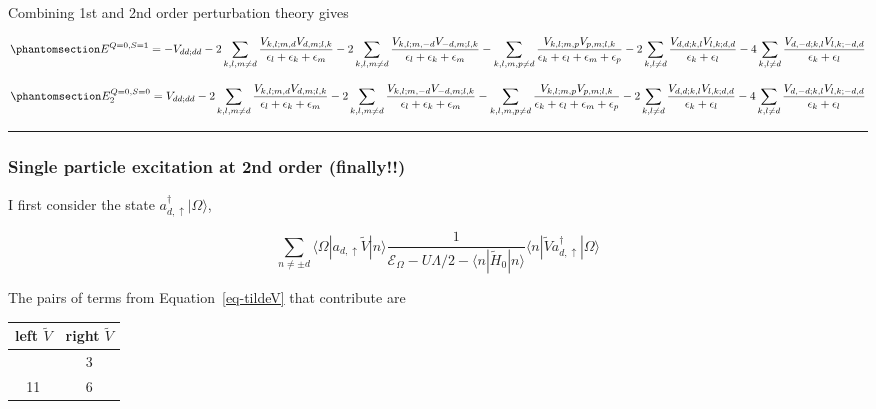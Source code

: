 \documentclass[
  letterpaper,
  DIV=11,
  numbers=noendperiod]{scrartcl}
\newcounter{none} %
\begin{document}
Combining 1st and 2nd order perturbation theory gives

\begin{equation}\protect\phantomsection\label{eq-EQ0S1}{
E^{Q=0,S=1}=-V_{dd;dd}-2\sum_{k,l,m\ne d}\frac{V_{k,l;m,d}V_{d,m;l,k}}{\epsilon_{l}+\epsilon_{k}+\epsilon_m}
-2\sum_{k,l,m\ne d}\frac{V_{k,l;m,-d}V_{-d,m;l,k}}{\epsilon_{l}+\epsilon_{k}+\epsilon_m}
-\sum_{k,l,m,p\ne d}\frac{V_{k,l;m,p}V_{p,m;l,k}}{\epsilon_{k}+\epsilon_{l}+\epsilon_m+\epsilon_p}
-2\sum_{k,l\ne d}\frac{V_{d,d;k,l}V_{l,k;d,d}}{\epsilon_{k}+\epsilon_{l}}
-4\sum_{k,l\ne d}\frac{V_{d,-d;k,l}V_{l,k;-d,d}}{\epsilon_{k}+\epsilon_{l}}
}\end{equation}

\begin{equation}\protect\phantomsection\label{eq-EQ0S02}{
E^{Q=0,S=0}_2=V_{dd;dd}-2\sum_{k,l,m\ne d}\frac{V_{k,l;m,d}V_{d,m;l,k}}{\epsilon_{l}+\epsilon_{k}+\epsilon_m}
-2\sum_{k,l,m\ne d}\frac{V_{k,l;m,-d}V_{-d,m;l,k}}{\epsilon_{l}+\epsilon_{k}+\epsilon_m}
-\sum_{k,l,m,p\ne d}\frac{V_{k,l;m,p}V_{p,m;l,k}}{\epsilon_{k}+\epsilon_{l}+\epsilon_m+\epsilon_p}
-2\sum_{k,l\ne d}\frac{V_{d,d;k,l}V_{l,k;d,d}}{\epsilon_{k}+\epsilon_{l}}
-4\sum_{k,l\ne d}\frac{V_{d,-d;k,l}V_{l,k;-d,d}}{\epsilon_{k}+\epsilon_{l}}
}\end{equation}

\begin{center}\rule{0.5\linewidth}{0.5pt}\end{center}

\subsubsection{Single particle excitation at 2nd order
(finally!!)}\label{single-particle-excitation-at-2nd-order-finally}

I first consider the state \(a^\dagger_{d,\uparrow}|\Omega\rangle\),

\begin{equation}
\sum_{n\ne \pm d}\langle\Omega|a_{d,\uparrow}\tilde V|n\rangle\frac{1}{\mathcal{E}_\Omega-U\Lambda/2-\langle n|\tilde H_0|n\rangle}\langle n|\tilde Va^\dagger_{d,\uparrow}|\Omega\rangle
\end{equation}

The pairs of terms from Equation~\ref{eq-tildeV} that contribute are

{\def\LTcaptype{none} %
\begin{longtable}[]{@{}cc@{}}
\toprule\noalign{}
left \(\tilde V\) & right \(\tilde V\) \\
\midrule\noalign{}
\endhead
\bottomrule\noalign{}
\endlastfoot
4 & 3 \\
11 & 6 \\
\end{longtable}
}
\end{document}
